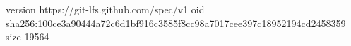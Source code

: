 version https://git-lfs.github.com/spec/v1
oid sha256:100ce3a90444a72c6d1bf916c3585f8cc98a7017cee397c18952194cd2458359
size 19564

